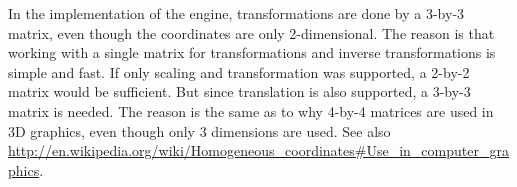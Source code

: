 In the implementation of the engine, transformations are done by
a 3-by-3 matrix, even though the coordinates are only 2-dimensional.
The reason is that working with a single matrix for transformations
and inverse transformations is simple and fast.
If only scaling and transformation was supported,
a 2-by-2 matrix would be sufficient. But since translation is
also supported, a 3-by-3 matrix is needed.
The reason is the same as to why 4-by-4 matrices are used in
3D graphics, even though only 3 dimensions are used.
See also \url{http://en.wikipedia.org/wiki/Homogeneous_coordinates#Use_in_computer_graphics}.

